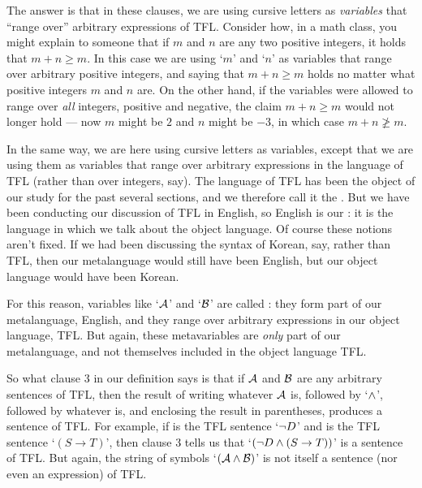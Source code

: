 The answer is that in these clauses, we are using cursive letters as \emph{variables} that ``range over'' arbitrary expressions of TFL.  Consider how, in a math class, you might explain to someone that if $m$ and $n$ are any two positive integers, it holds that $m + n \geq m$.  In this case we are using `$m$' and `$n$' as variables that range over arbitrary positive integers,  and saying that $m + n \geq m$ holds no matter what positive integers $m$  and $n$ are.  On the other hand, if the variables were allowed to range over \emph{all} integers, positive and negative,  the claim $m + n \geq m$ would not longer hold --- now $m$ might be $2$ and $n$ might be ${-3}$, in which case $m+n \ngeq m$.

In the same way, we are here using cursive letters as variables, except that we are using them as variables that range over arbitrary expressions in the language of TFL (rather than over integers, say).  The language of TFL has been the object of our study for the past several sections, and we therefore call it the .  But we have been conducting our discussion of TFL in English, so English is our : it is the language in which we talk about the object language.  Of course these notions aren't fixed.  If we had been discussing the syntax of Korean, say, rather than TFL, then our metalanguage would still have been English, but our object language would have been Korean.

For this reason, variables like `$\mathcal{A}$' and `$\mathcal{B}$' are called : they form part of our metalanguage, English, and they range over arbitrary expressions in our object language, TFL.  But again, these metavariables are \emph{only} part of our metalanguage, and not themselves included in the object language TFL.


		
So what clause 3 in our definition says is that if $\mathcal{A}$ and $\mathcal{B}$ are any arbitrary sentences of TFL, then the result of writing whatever $\mathcal{A}$ is, followed by `$\wedge$', followed by whatever  is, and enclosing the result in parentheses, produces a sentence of TFL.  For example, if  is the TFL sentence `$\neg D$' and  is the TFL sentence `$(S \rightarrow T)$', then clause 3 tells us that `$(\neg D \wedge (S \rightarrow T))$' is a sentence of TFL.  But again, the string of symbols `$(\mathcal{A} \wedge \mathcal{B})$' is not itself a sentence (nor even an expression) of TFL.

